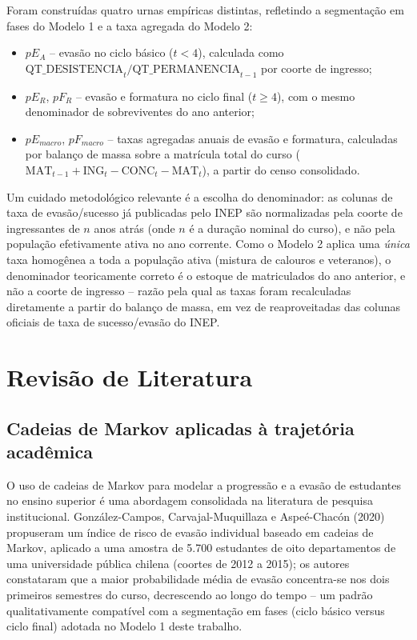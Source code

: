 \documentclass[12pt,times,article,chapter=TITLE]{abnt}
\begin{document}
Foram construídas quatro urnas empíricas distintas, refletindo a segmentação em fases do Modelo 1 e a taxa agregada do Modelo 2:
\begin{itemize}
  \item $pE_A$ -- evasão no ciclo básico ($t<4$), calculada como \(\text{QT\_DESISTENCIA}_t / \text{QT\_PERMANENCIA}_{t-1}\) por coorte de ingresso;
  \item $pE_R$, $pF_R$ -- evasão e formatura no ciclo final ($t\geq4$), com o mesmo denominador de sobreviventes do ano anterior;
  \item $pE_{macro}$, $pF_{macro}$ -- taxas agregadas anuais de evasão e formatura, calculadas por balanço de massa sobre a matrícula total do curso ($\text{MAT}_{t-1} + \text{ING}_t - \text{CONC}_t - \text{MAT}_t$), a partir do censo consolidado.
\end{itemize}

Um cuidado metodológico relevante é a escolha do denominador: as colunas de taxa de evasão/sucesso já publicadas pelo INEP são normalizadas pela coorte de ingressantes de $n$ anos atrás (onde $n$ é a duração nominal do curso), e não pela população efetivamente ativa no ano corrente. Como o Modelo 2 aplica uma \emph{única} taxa homogênea a toda a população ativa (mistura de calouros e veteranos), o denominador teoricamente correto é o estoque de matriculados do ano anterior, e não a coorte de ingresso -- razão pela qual as taxas foram recalculadas diretamente a partir do balanço de massa, em vez de reaproveitadas das colunas oficiais de taxa de sucesso/evasão do INEP.


\chapter{Revisão de Literatura}
\label{sec:literatura}

\section{Cadeias de Markov aplicadas à trajetória acadêmica}

O uso de cadeias de Markov para modelar a progressão e a evasão de estudantes no ensino superior é uma abordagem consolidada na literatura de pesquisa institucional. González-Campos, Carvajal-Muquillaza e Aspeé-Chacón (2020) propuseram um índice de risco de evasão individual baseado em cadeias de Markov, aplicado a uma amostra de 5.700 estudantes de oito departamentos de uma universidade pública chilena (coortes de 2012 a 2015); os autores constataram que a maior probabilidade média de evasão concentra-se nos dois primeiros semestres do curso, decrescendo ao longo do tempo -- um padrão qualitativamente compatível com a segmentação em fases (ciclo básico versus ciclo final) adotada no Modelo 1 deste trabalho.
\end{document}

